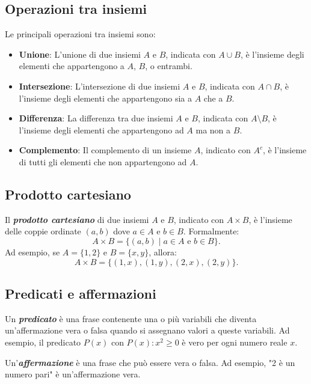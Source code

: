 \documentclass[a4paper,12pt]{article}
\begin{document}
\subsection{Operazioni tra insiemi}

Le principali operazioni tra insiemi sono:
\begin{itemize}
	\item \textbf{Unione}: L'unione di due insiemi \( A \) e \( B \), indicata con \( A \cup B \), è l'insieme degli elementi che appartengono a \( A \), \( B \), o entrambi.
	\item \textbf{Intersezione}: L'intersezione di due insiemi \( A \) e \( B \), indicata con \( A \cap B \), è l'insieme degli elementi che appartengono sia a \( A \) che a \( B \).
	\item \textbf{Differenza}: La differenza tra due insiemi \( A \) e \( B \), indicata con \( A \setminus B \), è l'insieme degli elementi che appartengono ad \( A \) ma non a \( B \).
	\item \textbf{Complemento}: Il complemento di un insieme \( A \), indicato con \( A^c \), è l'insieme di tutti gli elementi che non appartengono ad \( A \).
\end{itemize}

\subsection{Prodotto cartesiano}

Il \textbf{\emph{prodotto cartesiano}} di due insiemi \( A \) e \( B \), indicato con \( A \times B \), è l'insieme delle coppie ordinate \( (a, b) \) dove \( a \in A \) e \( b \in B \). Formalmente:
\[
	A \times B = \{ (a, b) \mid a \in A \text{ e } b \in B \}.
\]
Ad esempio, se \( A = \{1, 2\} \) e \( B = \{x, y\} \), allora:
\[
	A \times B = \{ (1, x), (1, y), (2, x), (2, y) \}.
\]

\subsection{Predicati e affermazioni}

Un \textbf{\emph{predicato}} è una frase contenente una o più variabili che diventa un'affermazione vera o falsa quando si assegnano valori a queste variabili. Ad esempio, il predicato \( P(x) \) con \( P(x): x^2 \geq 0 \) è vero per ogni numero reale \( x \).

Un'\textbf{\emph{affermazione}} è una frase che può essere vera o falsa. Ad esempio, "2 è un numero pari" è un'affermazione vera.
\end{document}
